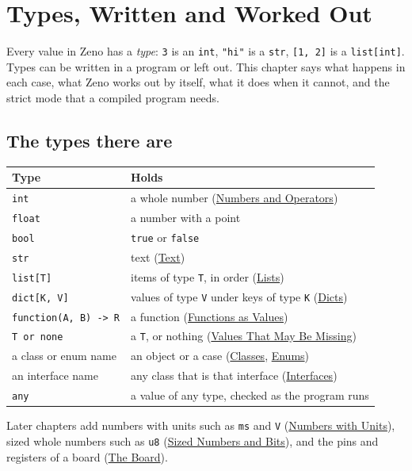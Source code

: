 \chapter{Types, Written and Worked Out}\label{ch-types}

Every value in Zeno has a \emph{type}: \verb|3| is an \verb|int|,
\verb|"hi"| is a \verb|str|, \verb|[1, 2]| is a \verb|list[int]|.
Types can be written in a program or left out. This chapter says what
happens in each case, what Zeno works out by itself, what it does when
it cannot, and the strict mode that a compiled program needs.

\section{The types there are}

\begin{center}
\begin{tabular}{lP{8.5cm}}
\toprule
Type & Holds \\
\midrule
\verb|int| & a whole number (\hyperref[ch-numbers]{Numbers and Operators}) \\
\verb|float| & a number with a point \\
\verb|bool| & \verb|true| or \verb|false| \\
\verb|str| & text (\hyperref[ch-text]{Text}) \\
\verb|list[T]| & items of type \verb|T|, in order (\hyperref[ch-lists]{Lists}) \\
\verb|dict[K, V]| & values of type \verb|V| under keys of type \verb|K| (\hyperref[ch-dicts]{Dicts}) \\
\verb|function(A, B) -> R| & a function (\hyperref[ch-function-values]{Functions as Values}) \\
\verb|T or none| & a \verb|T|, or nothing (\hyperref[ch-none]{Values That May Be Missing}) \\
a class or enum name & an object or a case (\hyperref[ch-classes]{Classes}, \hyperref[ch-enums]{Enums}) \\
an interface name & any class that is that interface (\hyperref[ch-interfaces]{Interfaces}) \\
\verb|any| & a value of any type, checked as the program runs \\
\bottomrule
\end{tabular}
\end{center}

Later chapters add numbers with units such as \verb|ms| and \verb|V|
(\hyperref[ch-units]{Numbers with Units}), sized whole numbers such as
\verb|u8| (\hyperref[ch-sized-numbers]{Sized Numbers and Bits}), and the pins and
registers of a board (\hyperref[ch-board]{The Board}).

